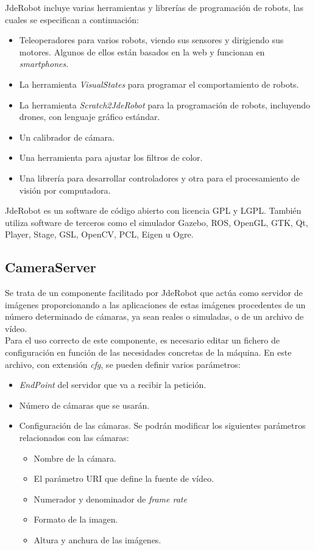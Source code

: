 \documentclass[a4paper, 12pt, spanish, chapterprefix, numbers=noenddot]{book}
\begin{document}
JdeRobot incluye varias herramientas y librerías de programación de robots, las cuales se especifican a continuación:

\begin{itemize}
\item Teleoperadores para varios robots, viendo sus sensores y dirigiendo sus motores. Algunos de ellos están basados en la web y funcionan en \textit{smartphones}. 
\item La herramienta \textit{VisualStates} para programar el comportamiento de robots.
\item La herramienta \textit{Scratch2JdeRobot} para la programación de robots, incluyendo drones, con lenguaje gráfico estándar.
\item Un calibrador de cámara.
\item Una herramienta para ajustar los filtros de color.
\item Una librería para desarrollar controladores y otra para el procesamiento de visión por computadora.
\end{itemize}

JdeRobot es un software de código abierto con licencia GPL y LGPL. También utiliza software de terceros como el simulador Gazebo, ROS, OpenGL, GTK, Qt, Player, Stage, GSL, OpenCV, PCL, Eigen u Ogre.


\subsection{CameraServer}\label{Camera}

Se trata de un componente facilitado por JdeRobot que actúa como servidor de imágenes proporcionando a las aplicaciones de estas imágenes procedentes de un número determinado de cámaras, ya sean reales o simuladas, o de un archivo de vídeo.\\

Para el uso correcto de este componente, es necesario editar un fichero de configuración en función de las necesidades concretas de la máquina. En este archivo, con extensión \textit{cfg}, se pueden definir varios parámetros:

\begin{itemize}
\item \textit{EndPoint} del servidor que va a recibir la petición.
\item Número de cámaras que se usarán.
\item Configuración de las cámaras. Se podrán modificar los siguientes parámetros relacionados con las cámaras:
\begin{itemize}
\item Nombre de la cámara.
\item El parámetro URI que define la fuente de vídeo.
\item Numerador y denominador de \textit{frame rate}
\item Formato de la imagen.
\item Altura y anchura de las imágenes.
\end{itemize}
\end{itemize}
\end{document}
